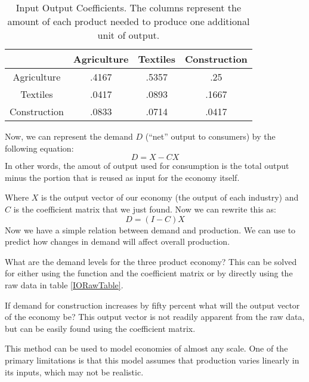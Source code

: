 \begin{table}

\begin{center}
\begin{tabular}{|c|c|c|c|} 
\hline
& Agriculture & Textiles & Construction \\ \hline
Agriculture & .4167 & .5357 & .25 \\ \hline
Textiles & .0417 & .0893 & .1667 \\ \hline
Construction & .0833 & .0714 & .0417 \\ \hline
\end{tabular}
\caption{Input Output Coefficients.
The columns represent the amount of each product needed to produce one additional unit of output.}
\label{IOCoefTable}
\end{center}
\end{table}

Now, we can represent the demand $D$ (``net'' output to consumers) by the following equation:
\[
D = X - CX
\]
In other words, the amout of output used for consumption is the total output minus the portion that is reused as input for the economy itself.

Where $X$ is the output vector of our economy (the output of each industry) and $C$ is the coefficient matrix that we just found.
Now we can rewrite this as:
\[
D = (I - C) X
\]
Now we have a simple relation between demand and production.
We can use  to predict how changes in demand will affect overall production.

\begin{problem}
What are the demand levels for the three product economy?
This can be solved for either using the  function and the coefficient matrix or by directly using the raw data in table \ref{IORawTable}.
\end{problem}

\begin{problem}
If demand for construction increases by fifty percent what will the output vector of the economy be?
This output vector is not readily apparent from the raw data, but can be easily found using the coefficient matrix.
\end{problem}

\begin{comment}
\begin{problem}
The file \li{WashingtonIOData.npy} contains the raw input output data for the state of Washington in the year 2002.
The last column is the output vector.
The source of this file is the file \li{io2002table.xls}, and you can find the industry corresponding to each column using that file.

Find the output vector if the demand for construction increases by ten percent.
This will require first finding the initial demand vector, and then increasing the correct entry by ten percent and using \li{linalg.lstsq()} to find the new output vector.
\end{problem}
\end{comment}

This method can be used to model economies of almost any scale.
One of the primary limitations is that this model assumes that production varies linearly in its inputs, which may not be realistic.


